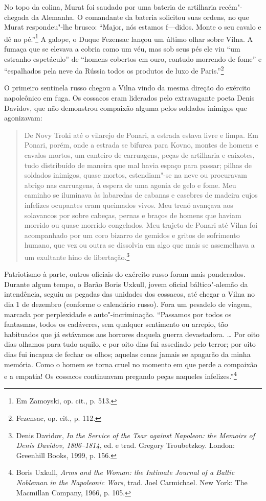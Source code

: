 No topo da colina, Murat foi saudado por uma bateria de artilharia
recém"-chegada da Alemanha. O comandante da bateria solicitou suas
ordens, no que Murat respondeu"-lhe brusco: ``Major, nós estamos
f---didos. Monte o seu cavalo e dê no pé.''\footnote{Em Zamoyski,
  op. cit., p. 513.} A galope, o Duque Fezensac lançou um último olhar
sobre Vilna. A fumaça que se elevava a cobria como um véu, mas sob seus
pés ele viu ``um estranho espetáculo'' de ``homens cobertos em ouro,
contudo morrendo de fome'' e ``espalhados pela neve da Rússia todos os
produtos de luxo de Paris.''\footnote{Fezensac, op. cit., p. 112.}

\asterisc

O primeiro sentinela russo chegou a Vilna vindo da mesma direção do
exército napoleônico em fuga. Os cossacos eram liderados pelo
extravagante poeta Denis Davidov, que não demonstrou compaixão alguma
pelos soldados inimigos que agonizavam:

\begin{quote}
De Novy Troki até o vilarejo de Ponari, a estrada estava livre e limpa.
Em Ponari, porém, onde a estrada se bifurca para Kovno, montes de homens
e cavalos mortos, um canteiro de carruagens, peças de artilharia e
caixotes, tudo distribuído de maneira que mal havia espaço para passar;
pilhas de soldados inimigos, quase mortos, estendiam"-se na neve ou
procuravam abrigo nas carruagens, à espera de uma agonia de gelo e fome.
Meu caminho se iluminava às labaredas de cabanas e casebres de madeira
cujos infelizes ocupantes eram queimados vivos. Meu trenó avançava aos
solavancos por sobre cabeças, pernas e braços de homens que haviam
morrido ou quase morrido congelados. Meu trajeto de Ponari até Vilna foi
acompanhado por um coro bizarro de gemidos e gritos de sofrimento
humano, que vez ou outra se dissolvia em algo que mais se assemelhava a
um exultante hino de libertação.\footnote{Denis Davidov, \emph{In the
  Service of the Tsar against Napoleon: the Memoirs of Denis Davidov,
  1806--1814}, ed. e trad. Gregory Troubetzkoy. London: Greenhill Books,
  1999, p. 156.}
\end{quote}

Patriotismo à parte, outros oficiais do exército russo foram mais
ponderados. Durante algum tempo, o Barão Boris Uxkull, jovem oficial
báltico"-alemão da intendência, seguiu as pegadas das unidades dos
cossacos, até chegar a Vilna no dia 1 de dezembro (conforme o calendário
russo). Fora um pesadelo de viagem, marcada por perplexidade e
auto"-incriminação. ``Passamos por todos os fantasmas, todos os
cadáveres, sem qualquer sentimento ou arrepio, tão habituados que já
estávamos aos horrores daquela guerra devastadora. \ldots{} Por oito
dias olhamos para tudo aquilo, e por oito dias fui assediado pelo
terror; por oito dias fui incapaz de fechar os olhos; aquelas cenas
jamais se apagarão da minha memória. Como o homem se torna cruel no
momento em que perde a compaixão e a empatia! Os cossacos continuavam
pregando peças naqueles infelizes.''\footnote{Boris Uxkull, \emph{Arms
  and the Woman: the Intimate Journal of a Baltic Nobleman in the
  Napoleonic Wars}, trad. Joel Carmichael. New York: The Macmillan
  Company, 1966, p. 105.}

